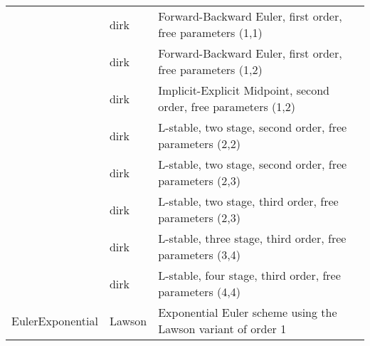 \begin{center}
\begin{tabular}{p{2.5cm}p{1cm}p{10cm}}
               & dirk & Forward-Backward Euler, first order, free parameters (1,1)\\
               & dirk & Forward-Backward Euler, first order, free parameters (1,2)\\
               & dirk & Implicit-Explicit Midpoint, second order, free parameters (1,2)\\
               & dirk & L-stable, two stage, second order, free parameters (2,2)\\
               & dirk & L-stable, two stage, second order, free parameters (2,3)\\
               & dirk & L-stable, two stage, third order, free parameters (2,3)\\
               & dirk & L-stable, three stage, third order, free parameters (3,4)\\
               & dirk & L-stable, four stage, third order, free parameters (4,4)\\

EulerExponential & Lawson  & Exponential Euler scheme using the
                             Lawson variant of order 1 \\


\end{tabular}
\end{center}
